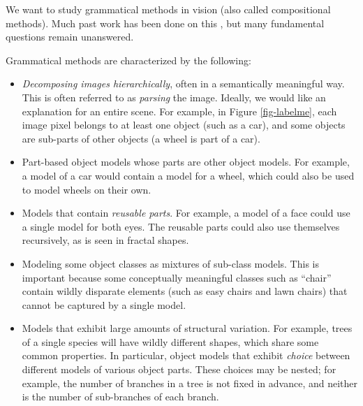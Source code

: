 

We want to study grammatical methods in vision (also called
compositional methods). Much past work has been done on this
\cite{pop, potter-geman-bienenstock, ks-fu, potter-geman-chi, 
  grenander, zhu-han, jin-geman, potter, zhu-tu-chen-yuille,
  zhu-chen-yuille, zhu-mumford}, but many fundamental questions remain
unanswered.

Grammatical methods are characterized by the following:
\begin{itemize}
\item \emph{Decomposing images hierarchically}, often in a semantically
  meaningful way. This is often referred to as \emph{parsing} the
  image. Ideally, we would like an explanation for an entire
  scene. For example, in Figure \ref{fig-labelme}, each image pixel
  belongs to at least one object (such as a car), and some objects are
  sub-parts of other objects (a wheel is part of a car).
\item Part-based object models whose parts are other object
  models. For example, a model of a car would contain a model for a
  wheel, which could also be used to model wheels on their own.
\item Models that contain \emph{reusable parts}. For example, a model of a
  face could use a single model for both eyes. The reusable parts
  could also use themselves recursively, as is seen in fractal shapes.
\item Modeling some object classes as mixtures of sub-class
  models. This is important because some conceptually meaningful
  classes such as ``chair'' contain wildly disparate elements (such as
  easy chairs and lawn chairs) that cannot be captured by a single
  model.
\item Models that exhibit large amounts of structural variation. For
  example, trees of a single species will have wildly different
  shapes, which share some common properties. In particular, object
  models that exhibit \emph{choice} between different models of
  various object parts. These choices may be nested; for example, the
  number of branches in a tree is not fixed in advance, and neither is
  the number of sub-branches of each branch.
\end{itemize}


